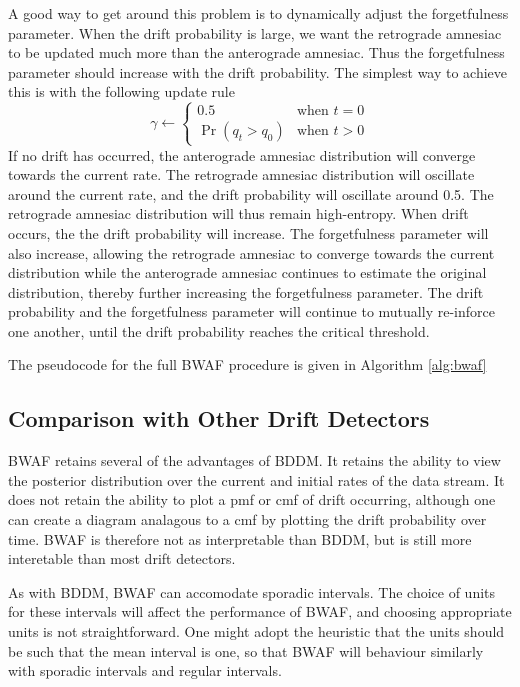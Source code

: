 A good way to get around this problem is to dynamically adjust the forgetfulness parameter. When the drift probability is large, we want the retrograde amnesiac to be updated much more than the anterograde amnesiac. Thus the forgetfulness parameter should increase with the drift probability. The simplest way to achieve this is with the following update rule
\begin{equation}
    \gamma \gets \begin{cases}
        0.5 & \text{when }t=0 \\
        \Pr(q_t > q_0) & \text{when }t>0
    \end{cases}
\end{equation}
If no drift has occurred, the anterograde amnesiac distribution will converge towards the current rate. The retrograde amnesiac distribution will oscillate around the current rate, and the drift probability will oscillate around 0.5. The retrograde amnesiac distribution will thus remain high-entropy. When drift occurs, the the drift probability will increase. The forgetfulness parameter will also increase, allowing the retrograde amnesiac to converge towards the current distribution while the anterograde amnesiac continues to estimate the original distribution, thereby further increasing the forgetfulness parameter. The drift probability and the forgetfulness parameter will continue to mutually re-inforce one another, until the drift probability reaches the critical threshold. 

The pseudocode for the full BWAF procedure is given in Algorithm \ref{alg:bwaf}

\subsection{Comparison with Other Drift Detectors}

BWAF retains several of the advantages of BDDM. It retains the ability to view the posterior distribution over the current and initial rates of the data stream. It does not retain the ability to plot a pmf or cmf of drift occurring, although one can create a diagram analagous to a cmf by plotting the drift probability over time. BWAF is therefore not as interpretable than BDDM, but is still more interetable than most drift detectors. 

As with BDDM, BWAF can accomodate sporadic intervals. The choice of units for these intervals will affect the performance of BWAF, and choosing appropriate units is not straightforward. One might adopt the heuristic that the units should be such that the mean interval is one, so that BWAF will behaviour similarly with sporadic intervals and regular intervals. 

